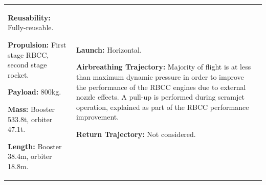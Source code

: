 {\begin{landscape}
\begin{xltabular}{\linewidth}{|X|X|X|}
	\textbf{Reusability:} Fully-reusable. 
	
	\textbf{Propulsion:} First stage RBCC, second stage rocket. 
	
	\textbf{Payload:} 800kg.

	 \textbf{Mass:} Booster 533.8t, orbiter 47.1t.
	 
	 \textbf{Length:} Booster 38.4m, orbiter 18.8m. 
	 
	
	&\small
	
	\textbf{Launch:} Horizontal. 
	
	\textbf{Airbreathing Trajectory:} Majority of flight is at less than maximum dynamic pressure in order to improve the performance of the RBCC engines due to external nozzle effects. A pull-up is performed during scramjet operation, explained as part of the RBCC performance improvement.

	
	\textbf{Return Trajectory:} Not considered. 
	

\end{xltabular}
\end{landscape}}
